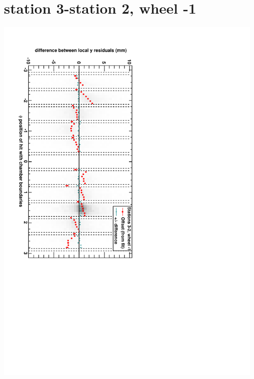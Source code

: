 \documentclass[compress]{beamer}
\begin{document}
\section*{station 3-station 2, wheel -1}
\begin{frame} \vfill \mbox{\hspace{-1 cm}\includegraphics[height=1.2\linewidth, angle=90]{DTzdiff23VsPhi_whB_slope.pdf}} \end{frame}
\end{document}
